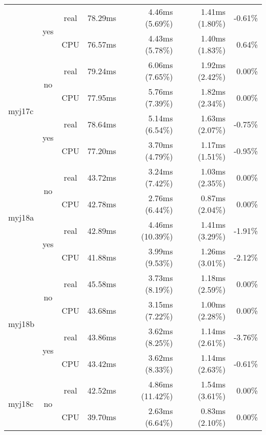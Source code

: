 \documentclass[en]{pracamgr}
\begin{document}
\begin{appendices}
\begin{small}
\begin{longtable}{|l|c|c|r|r|r|r|}
                          \cline{2-7}
                          & \multirow{2}{*}{yes} & real & 78.29ms & 4.46ms (5.69\%) & 1.41ms (1.80\%) & -0.61\% \\*
                          &                      & CPU  & 76.57ms & 4.43ms (5.78\%) & 1.40ms (1.83\%) & 0.64\% \\
\hline
\multirow{4}{*}{myj17c}   & \multirow{2}{*}{no}  & real & 79.24ms & 6.06ms (7.65\%) & 1.92ms (2.42\%) & 0.00\% \\*
                          &                      & CPU  & 77.95ms & 5.76ms (7.39\%) & 1.82ms (2.34\%) & 0.00\% \\*
                          \cline{2-7}
                          & \multirow{2}{*}{yes} & real & 78.64ms & 5.14ms (6.54\%) & 1.63ms (2.07\%) & -0.75\% \\*
                          &                      & CPU  & 77.20ms & 3.70ms (4.79\%) & 1.17ms (1.51\%) & -0.95\% \\
\hline
\multirow{4}{*}{myj18a}   & \multirow{2}{*}{no}  & real & 43.72ms & 3.24ms (7.42\%) & 1.03ms (2.35\%) & 0.00\% \\*
                          &                      & CPU  & 42.78ms & 2.76ms (6.44\%) & 0.87ms (2.04\%) & 0.00\% \\*
                          \cline{2-7}
                          & \multirow{2}{*}{yes} & real & 42.89ms & 4.46ms (10.39\%) & 1.41ms (3.29\%) & -1.91\% \\*
                          &                      & CPU  & 41.88ms & 3.99ms (9.53\%) & 1.26ms (3.01\%) & -2.12\% \\
\hline
\multirow{4}{*}{myj18b}   & \multirow{2}{*}{no}  & real & 45.58ms & 3.73ms (8.19\%) & 1.18ms (2.59\%) & 0.00\% \\*
                          &                      & CPU  & 43.68ms & 3.15ms (7.22\%) & 1.00ms (2.28\%) & 0.00\% \\*
                          \cline{2-7}
                          & \multirow{2}{*}{yes} & real & 43.86ms & 3.62ms (8.25\%) & 1.14ms (2.61\%) & -3.76\% \\*
                          &                      & CPU  & 43.42ms & 3.62ms (8.33\%) & 1.14ms (2.63\%) & -0.61\% \\
\hline
\multirow{4}{*}{myj18c}   & \multirow{2}{*}{no}  & real & 42.52ms & 4.86ms (11.42\%) & 1.54ms (3.61\%) & 0.00\% \\*
                          &                      & CPU  & 39.70ms & 2.63ms (6.64\%) & 0.83ms (2.10\%) & 0.00\% \\*

\end{longtable}
\end{small}
\end{appendices}
\end{document}
